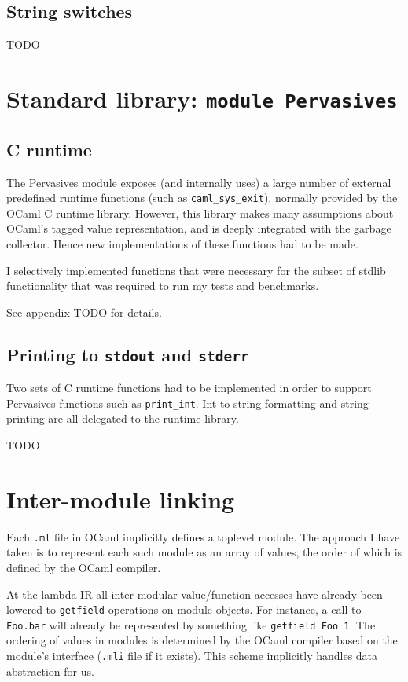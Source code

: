 \documentclass[12pt,a4paper,twoside,openright]{report}
\begin{document}
\subsection{String switches}\label{stringswitch}

TODO

\section{Standard library: \texttt{module Pervasives}}

\subsection{C runtime}

The Pervasives module exposes (and internally uses) a large number of external
predefined runtime functions (such as \lstinline!caml_sys_exit!), normally
provided by the OCaml C runtime library. However, this library makes many
assumptions about OCaml's tagged value representation, and is deeply integrated
with the garbage collector. Hence new implementations of these functions had to
be made.

I selectively implemented functions that were necessary for the subset of
stdlib functionality that was required to run my tests and benchmarks.

See appendix TODO for details.

\subsection{Printing to \texttt{stdout} and \texttt{stderr}}\label{pervasives-printing}

Two sets of C runtime functions had to be implemented in order to support
Pervasives functions such as \lstinline!print_int!. Int-to-string formatting
and string printing are all delegated to the runtime library.

TODO

\section{Inter-module linking}

Each \lstinline!.ml! file in OCaml implicitly defines a toplevel module. The
approach I have taken is to represent each such module as an array of values,
the order of which is defined by the OCaml compiler.

At the lambda IR all inter-modular value/function accesses have already been
lowered to \lstinline!getfield! operations on module objects. For instance, a
call to \lstinline!Foo.bar! will already be represented by something like
\lstinline!getfield Foo 1!. The ordering of values in modules is determined by
the OCaml compiler based on the module's interface (\lstinline!.mli! file if it
exists). This scheme implicitly handles data abstraction for us.
\end{document}
